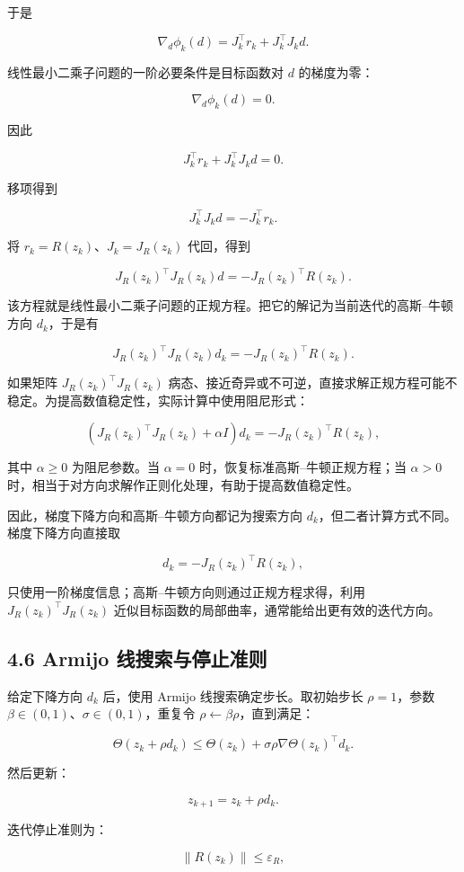 \documentclass[UTF8,a4paper,zihao=-4]{ctexart}
\begin{document}
于是

\[
\nabla_d\phi_k(d)=J_k^\top r_k+J_k^\top J_kd.
\]

线性最小二乘子问题的一阶必要条件是目标函数对 $d$ 的梯度为零：

\[
\nabla_d\phi_k(d)=0.
\]

因此

\[
J_k^\top r_k+J_k^\top J_kd=0.
\]

移项得到

\[
J_k^\top J_kd=-J_k^\top r_k.
\]

将 $r_k=R(z_k)$、$J_k=J_R(z_k)$ 代回，得到

\[
J_R(z_k)^\top J_R(z_k)d
=-J_R(z_k)^\top R(z_k).
\]

该方程就是线性最小二乘子问题的正规方程。把它的解记为当前迭代的高斯--牛顿方向 $d_k$，于是有

\[
J_R(z_k)^\top J_R(z_k)d_k
=-J_R(z_k)^\top R(z_k).
\]

如果矩阵 $J_R(z_k)^\top J_R(z_k)$ 病态、接近奇异或不可逆，直接求解正规方程可能不稳定。为提高数值稳定性，实际计算中使用阻尼形式：

\[
\left(J_R(z_k)^\top J_R(z_k)+\alpha I\right)d_k
=-J_R(z_k)^\top R(z_k),
\]

其中 $\alpha\geq 0$ 为阻尼参数。当 $\alpha=0$ 时，恢复标准高斯--牛顿正规方程；当 $\alpha>0$ 时，相当于对方向求解作正则化处理，有助于提高数值稳定性。

因此，梯度下降方向和高斯--牛顿方向都记为搜索方向 $d_k$，但二者计算方式不同。梯度下降方向直接取

\[
d_k=-J_R(z_k)^\top R(z_k),
\]

只使用一阶梯度信息；高斯--牛顿方向则通过正规方程求得，利用 $J_R(z_k)^\top J_R(z_k)$ 近似目标函数的局部曲率，通常能给出更有效的迭代方向。

\subsection{4.6 Armijo 线搜索与停止准则}

给定下降方向 $d_k$ 后，使用 Armijo 线搜索确定步长。取初始步长 $\rho=1$，参数 $\beta\in(0,1)$、$\sigma\in(0,1)$，重复令 $\rho\leftarrow\beta\rho$，直到满足：

\[
\Theta(z_k+\rho d_k)
\leq
\Theta(z_k)+\sigma\rho\nabla\Theta(z_k)^\top d_k.
\]

然后更新：

\[
z_{k+1}=z_k+\rho d_k.
\]

迭代停止准则为：

\[
\|R(z_k)\|\leq \varepsilon_R,
\]
\end{document}
